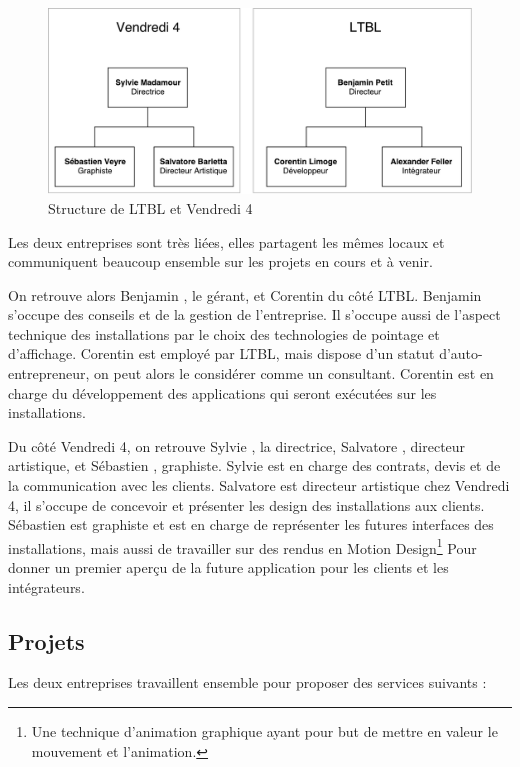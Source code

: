 \begin{figure}[h]
    \centering
    \includegraphics[scale=0.7]{img/Structure-LTBL.pdf}
    \caption{Structure de LTBL et Vendredi 4}
\end{figure}

Les deux entreprises sont très liées, elles partagent les mêmes locaux et communiquent beaucoup ensemble sur les projets en cours et à venir.

On retrouve alors Benjamin , le gérant, et Corentin  du côté LTBL.
Benjamin s'occupe des conseils et de la gestion de l'entreprise.
Il s'occupe aussi de l'aspect technique des installations par le choix des technologies de pointage et d'affichage.
Corentin est employé par LTBL, mais dispose d'un statut d'auto-entrepreneur, on peut alors le considérer comme un consultant.
Corentin est en charge du développement des applications qui seront exécutées sur les installations.

Du côté Vendredi 4, on retrouve Sylvie , la directrice, Salvatore , directeur artistique, et Sébastien , graphiste.
Sylvie est en charge des contrats, devis et de la communication avec les clients.
Salvatore est directeur artistique chez Vendredi 4, il s'occupe de concevoir et présenter les design des installations aux clients.
Sébastien est graphiste et est en charge de représenter les futures interfaces des installations, mais aussi de travailler sur des rendus en Motion Design\footnote{Une technique d'animation graphique ayant pour but de mettre en valeur le mouvement et l'animation.} Pour donner un premier aperçu de la future application pour les clients et les intégrateurs.

\subsection{Projets}

Les deux entreprises travaillent ensemble pour proposer des services suivants :


